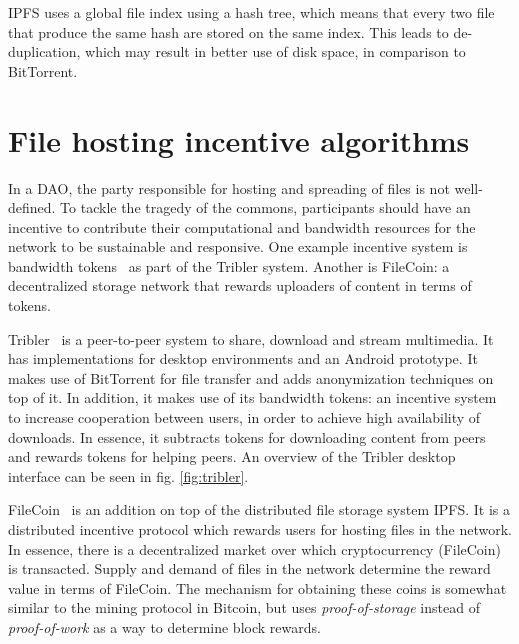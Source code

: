 IPFS uses a global file index using a hash tree, which means that every two file that produce the same hash are stored on the same index. This leads to de-duplication, which may result in better use of disk space, in comparison to BitTorrent.



\section{File hosting incentive algorithms}
\label{sec:file-spreading-incentives}
In a DAO, the party responsible for hosting and spreading of files is not well-defined. To tackle the tragedy of the commons, participants should have an incentive to contribute their computational and bandwidth resources for the network to be sustainable and responsive. One example incentive system is bandwidth tokens~\citep{de2018blockchain} as part of the Tribler system. Another is FileCoin: a decentralized storage network that rewards uploaders of content in terms of tokens.

Tribler~\citep{pouwelse2008tribler} is a peer-to-peer system to share, download and stream multimedia. It has implementations for desktop environments and an Android prototype. It makes use of BitTorrent for file transfer and adds anonymization techniques on top of it. In addition, it makes use of its bandwidth tokens: an incentive system to increase cooperation between users, in order to achieve high availability of downloads. In essence, it subtracts tokens for downloading content from peers and rewards tokens for helping peers. An overview of the Tribler desktop interface can be seen in fig. \ref{fig:tribler}.

FileCoin~\citep{benet2018filecoin} is an addition on top of the distributed file storage system IPFS. It is a distributed incentive protocol which rewards users for hosting files in the network. In essence, there is a decentralized market over which cryptocurrency (FileCoin) is transacted. Supply and demand of files in the network determine the reward value in terms of FileCoin. The mechanism for obtaining these coins is somewhat similar to the mining protocol in Bitcoin, but uses \textit{proof-of-storage} instead of \textit{proof-of-work} as a way to determine block rewards.